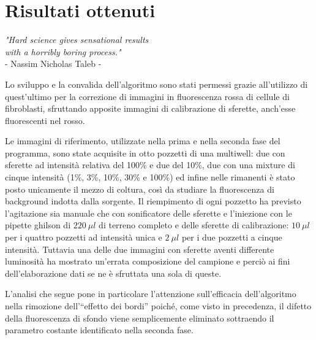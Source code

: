 \clearpage{\pagestyle{empty}\cleardoublepage}

\chapter{Risultati ottenuti}

\begin{flushright}\begin{small}\textit{"Hard science gives sensational results\\ with a horribly boring process."}\\
- Nassim Nicholas Taleb -\\
\end{small}\end{flushright}

Lo sviluppo e la convalida dell'algoritmo sono stati permessi grazie all'utilizzo di quest'ultimo per la correzione di immagini in fluorescenza rossa di cellule di fibroblasti, sfruttando apposite immagini di calibrazione di sferette, anch'esse fluorescenti nel rosso.

Le immagini di riferimento, utilizzate nella prima e nella seconda fase del programma, sono state acquisite in otto pozzetti di una multiwell: due con sferette ad intensità relativa del 100\% e due del 10\%, due con una mixture di cinque intensità (1\%, 3\%, 10\%, 30\% e 100\%) ed infine nelle rimanenti è stato posto unicamente il mezzo di coltura, così da studiare la fluorescenza di background indotta dalla sorgente.
Il riempimento di ogni pozzetto ha previsto l'agitazione sia manuale che con sonificatore delle sferette e l'iniezione con le pipette ghilson di $220\ \mu l$ di terreno completo e delle sferette di calibrazione: $10\ \mu l$ per i quattro pozzetti ad intensità unica e $2\ \mu l$ per i due pozzetti a cinque intensità.
Tuttavia una delle due immagini con sferette aventi differente luminosità ha mostrato un'errata composizione del campione e perciò ai fini dell'elaborazione dati se ne è sfruttata una sola di queste.

L'analisi che segue pone in particolare l'attenzione sull'efficacia dell'algoritmo nella rimozione dell'``effetto dei bordi'' poiché, come visto in precedenza, il difetto della fluorescenza di sfondo viene semplicemente eliminato sottraendo il parametro costante identificato nella seconda fase.

